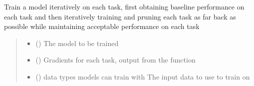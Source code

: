\documentclass[letterpaper,10pt,english]{sphinxmanual}
\begin{document}
\begin{fulllineitems}
\label{\detokenize{beyondml.tflow.utils:beyondml.tflow.utils.utils.train_model_iteratively}}
\pysigstartsignatures
{}
\pysigstopsignatures
\sphinxAtStartPar
Train a model iteratively on each task, first obtaining
baseline performance on each task and then iteratively
training and pruning each task as far back as possible while
maintaining acceptable performance on each task
\begin{quote}\begin{description}
\begin{itemize}
\item {} 
\sphinxAtStartPar
{} () \textendash{} The model to be trained

\item {} 
\sphinxAtStartPar
{} () \textendash{} Gradients for each task, output from the  function

\item {} 
\sphinxAtStartPar
{} (\sphinxstyleliteralemphasis{\sphinxupquote{, }}) \textendash{} data types models can train with
The input data to use to train on


\end{itemize}
\end{description}
\end{quote}
\end{fulllineitems}
\end{document}

